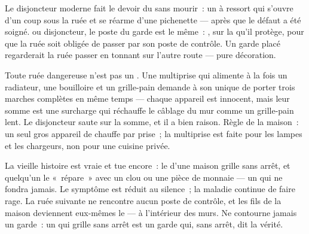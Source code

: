 \begin{example}\label{ex:g7:short-circuits-safety:breaker}
Le disjoncteur moderne fait le devoir du  sans mourir~: un
 à ressort qui s'ouvre d'un coup sous la ruée et se
réarme d'une pichenette --- après que le défaut a été soigné.
 ou disjoncteur, le poste du garde est le même~: \emph{}, sur la  qu'il protège, pour que la ruée soit obligée
de passer par son poste de contrôle. Un garde placé 
regarderait la ruée passer en tonnant sur l'autre route --- pure
décoration.
\end{example}

\begin{example}\label{ex:g7:short-circuits-safety:overload}
Toute ruée dangereuse n'est pas un . Une multiprise qui
alimente à la fois un radiateur, une bouilloire et un grille-pain
demande à son unique  de porter trois marches complètes en
même temps --- chaque appareil est innocent, mais leur somme est une
surcharge qui réchauffe le câblage du mur comme un grille-pain lent.
Le disjoncteur saute sur la somme, et il a bien raison. Règle de la
maison~: un seul gros appareil de chauffe par prise~; la multiprise
est faite pour les lampes et les chargeurs, non pour une cuisine
privée.
\end{example}

\begin{remark}\label{rem:g7:short-circuits-safety:nail}
La vieille histoire est vraie et tue encore~: le  d'une maison
grille sans arrêt, et quelqu'un le «~répare~» avec un clou ou une
pièce de monnaie --- un   qui ne fondra jamais. Le
symptôme est réduit au silence~; la maladie continue de faire rage.
La ruée suivante ne rencontre aucun poste de contrôle, et les fils de
la maison deviennent eux-mêmes le  --- à l'intérieur des murs.
Ne contourne jamais un garde~: un  qui grille sans arrêt est
un garde qui, sans arrêt, dit la vérité.
\end{remark}

